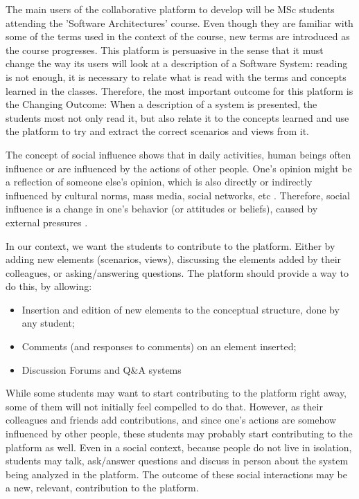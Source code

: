 The main users of the collaborative platform to develop will be MSc students attending the 'Software  Architectures' course. Even though they are familiar with some of the terms used in the context of the course, new terms are introduced as the course progresses. This platform is persuasive in the sense that it must change the way its users will look at a description of a Software System: reading is not enough, it is necessary to relate what is read with the terms and concepts learned in the classes.
Therefore, the most important outcome for this platform is the Changing Outcome: When a description of a system is presented, the students most not only read it, but also relate it to the concepts learned and use the platform to try and extract the correct scenarios and views from it.

The concept of social influence shows that in daily activities, human beings often influence or are influenced by the actions of other people. One's opinion might be a reflection of someone else's opinion, which is also directly or indirectly influenced by cultural norms, mass media, social networks, etc \cite{mavrodiev2013quantifying}. Therefore, social influence is a change in one's behavior (or attitudes or beliefs), caused by external pressures \cite{guadagno2010preference}. 

In our context, we want the students to contribute to the platform. Either by adding new elements (scenarios, views), discussing the elements added by their colleagues, or asking/answering questions. 
The platform should provide a way to do this, by allowing: 
\begin{itemize}
\item Insertion and edition of new elements to the conceptual structure, done by any student;
\item Comments (and responses to comments) on an element inserted;
\item Discussion Forums and Q\&A systems
\end{itemize}

While some students may want to start contributing to the platform right away, some of them will not initially feel compelled to do that. However, as their colleagues and friends add contributions, and since one's actions are somehow influenced by other people, these students may probably start contributing to the platform as well. Even in a social context, because people do not live in isolation, students may talk, ask/answer questions and discuss in person about the system being analyzed in the platform. The outcome of these social interactions may be a new, relevant, contribution to the platform.

